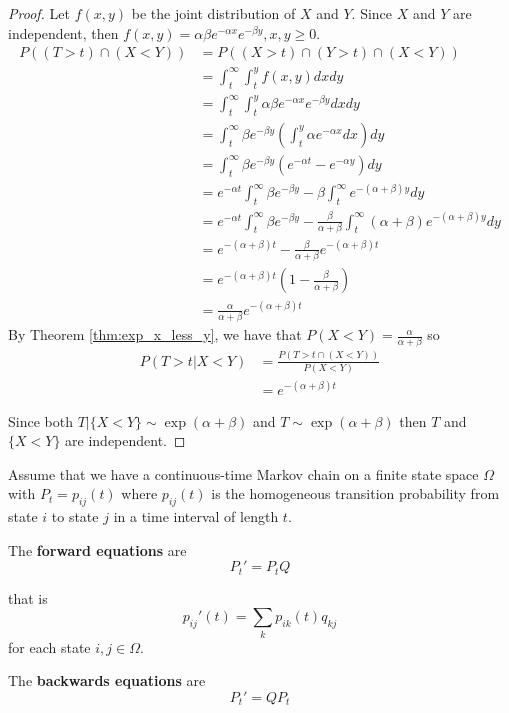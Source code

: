 \begin{proof}
Let $f(x,y)$ be the joint distribution of $X$ and $Y$.
Since $X$ and $Y$ are independent, then $f(x,y) = \alpha \beta e^{-\alpha x} e^{-\beta y}, x,y \geq 0$.
\begin{align*}
    P((T > t) \cap (X < Y)) &= P((X > t) \cap (Y > t) \cap (X < Y))\\
    &= \int_t^\infty \int_t^y f(x,y) dx dy\\
    &= \int_t^\infty \int_t^y \alpha \beta e^{-\alpha x} e^{-\beta y} dx dy\\
    &= \int_t^\infty \beta e^{-\beta y} \left(\int_t^y \alpha e^{-\alpha x} dx \right)  dy\\
    &= \int_t^\infty \beta e^{-\beta y} \left( e^{-\alpha t} - e^{-\alpha y} \right) dy\\
    &= e^{-\alpha t} \int_t^\infty \beta e^{-\beta y} - \beta \int_t^\infty e^{-(\alpha + \beta) y} dy\\
    &= e^{-\alpha t} \int_t^\infty \beta e^{-\beta y} - \frac{\beta}{\alpha + \beta} \int_t^\infty (\alpha + \beta) e^{-(\alpha + \beta) y} dy\\
    &= e^{-(\alpha + \beta) t} - \frac{\beta}{\alpha + \beta} e^{-(\alpha + \beta) t}\\
    &= e^{-(\alpha + \beta) t} \left(1 - \frac{\beta}{\alpha + \beta} \right)\\
    &= \frac{\alpha}{\alpha + \beta} e^{-(\alpha + \beta) t}
\end{align*}
By Theorem \ref{thm:exp_x_less_y}, we have that $P(X < Y) = \frac{\alpha}{\alpha + \beta}$ so
\begin{align*}
    P(T > t | X < Y) &= \frac{P(T > t \cap (X < Y))}{P(X < Y)}\\
    &= e^{-(\alpha + \beta) t}
\end{align*}

Since both $T | \{X < Y\} \sim \exp(\alpha + \beta)$ and $T \sim \exp(\alpha + \beta)$ then $T$ and $\{X < Y\}$ are independent.
\end{proof}

\begin{theorem} \cite{grimmett2001}
Assume that we have a continuous-time Markov chain on a finite state space $\Omega$ with $P_t = p_{ij}(t)$ where $p_{ij}(t)$ is the homogeneous transition probability from state $i$ to state $j$ in a time interval of length $t$.

The \textbf{forward equations} are
\begin{equation}
    \label{eq:forward_eqs}
    P_t' = P_t Q
\end{equation}

that is
$$
p_{ij}'(t) = \sum_{k} p_{ik}(t) q_{kj}
$$
for each state $i,j \in \Omega$.

The \textbf{backwards equations} are
\begin{equation}
    \label{eq:backwards_eqs}
    P_t' = Q P_t
\end{equation}
\end{theorem}

